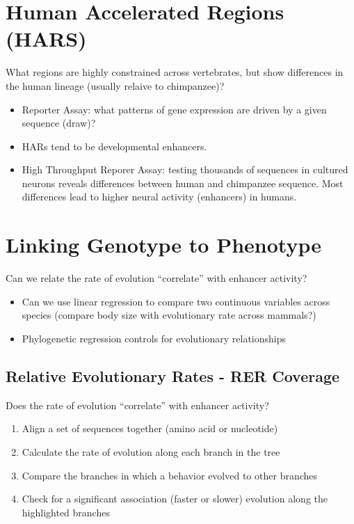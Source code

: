 \documentclass[10pt]{article}
\begin{document}
\section*{Human Accelerated Regions (HARS)}
What regions are highly constrained across vertebrates, but show differences in the human lineage (usually relaive to chimpanzee)?
\begin{itemize}
	\item Reporter Assay: what patterns of gene expression are driven by a given sequence (draw)?
	\item HARs tend to be developmental enhancers.
	\item High Throughput Reporer Assay: testing thousands of sequences in cultured neurons reveals differences between human and chimpanzee sequence.  Most differences lead to higher neural activity (enhancers) in humans.
\end{itemize}

\section*{Linking Genotype to Phenotype}
Can we relate the rate of evolution ``correlate'' with enhancer activity?
\begin{itemize}
	\item Can we use linear regression to compare two continuous variables across species (compare body size with evolutionary rate across mammals?)
	\item Phylogenetic regression controls for evolutionary relationships
\end{itemize}

\subsection*{Relative Evolutionary Rates - RER Coverage}
Does the rate of evolution ``correlate'' with enhancer activity?
\begin{enumerate}
	\item Align a set of sequences together (amino acid or nucleotide)
	\item Calculate the rate of evolution along each branch in the tree
	\item Compare the branches in which a behavior evolved to other branches
	\item Check for a significant association (faster or slower) evolution along the highlighted branches
\end{enumerate}
\end{document}
